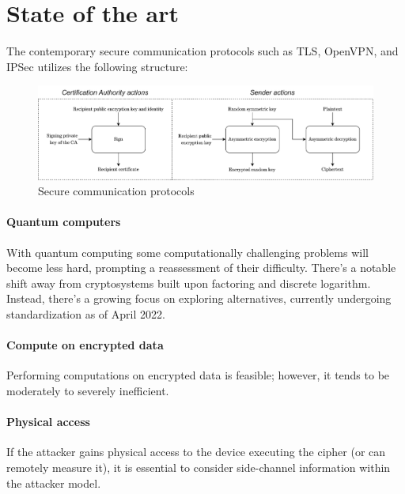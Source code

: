 \section{State of the art}

The contemporary secure communication protocols such as TLS, OpenVPN, and IPSec utilizes the following structure: 
\begin{figure}[H]
    \centering
    \includegraphics[width=1\linewidth]{images/ssp.png}
    \caption{Secure communication protocols}
\end{figure}

\paragraph*{Quantum computers}
With quantum computing some computationally challenging problems will become less hard, prompting a reassessment of their difficulty. 
There's a notable shift away from cryptosystems built upon factoring and discrete logarithm. 
Instead, there's a growing focus on exploring alternatives, currently undergoing standardization as of April 2022.

\paragraph*{Compute on encrypted data}
Performing computations on encrypted data is feasible; however, it tends to be moderately to severely inefficient.

\paragraph*{Physical access}
If the attacker gains physical access to the device executing the cipher (or can remotely measure it), it is essential to consider side-channel information within the attacker model.